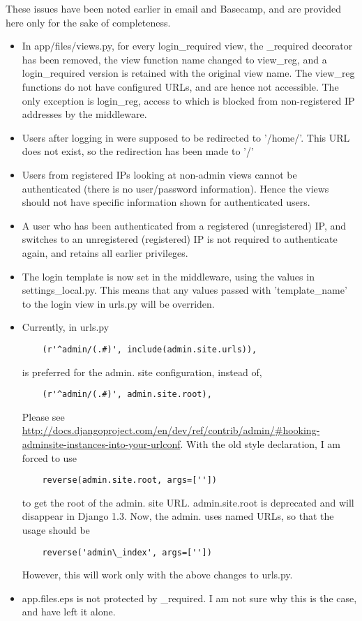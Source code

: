 \label{sec:issues}
These issues have been noted earlier in email and Basecamp, and
are provided here only for the sake of completeness.
\begin{itemize}
\item In app/files/views.py, for every login\_required view, the
  \@login\_required decorator has been removed, the view function
  name changed to view\_reg, and a login\_required version is
  retained with the original view name.  The view\_reg functions
  do not have configured URLs, and are hence not accessible. The
  only exception is login\_reg, access to which is blocked from
  non-registered IP addresses by the middleware.
\item Users after logging in were supposed to be redirected to
  '/home/'. This URL does not exist, so the redirection has been
  made to '/'
\item Users from registered IPs looking at non-admin views cannot
  be authenticated (there is no user/password information). Hence
  the views should not have specific information shown for
  authenticated users.
\item A user who has been authenticated from a registered
  (unregistered) IP, and switches to an unregistered (registered)
  IP is not required to authenticate again, and retains all
  earlier privileges.
\item The login template is now set in the middleware, using the
  values in settings\_local.py. This means that any values passed
  with 'template\_name' to the login view in urls.py will be
  overriden.
\item Currently, in urls.py
  \begin{Verbatim}
    (r'^admin/(.#)', include(admin.site.urls)),
  \end{Verbatim}
  is preferred for the admin. site configuration, instead of,
  \begin{Verbatim}
    (r'^admin/(.#)', admin.site.root),
  \end{Verbatim}
  Please see \url{http://docs.djangoproject.com/en/dev/ref/contrib/admin/#hooking-adminsite-instances-into-your-urlconf}. With the old style declaration, I am
  forced to use
  \begin{Verbatim}
    reverse(admin.site.root, args=['']) 
  \end{Verbatim}
  to get the root of the admin. site URL. admin.site.root is deprecated
  and will disappear in Django 1.3. Now, the admin. uses named URLs, so
  that the usage should be
  \begin{Verbatim}
    reverse('admin\_index', args=[''])
  \end{Verbatim}
  However, this will work only with the above changes to urls.py.
\item app.files.eps is not protected by \@login\_required. I am not sure why
  this is the case, and have left it alone.
\end{itemize}